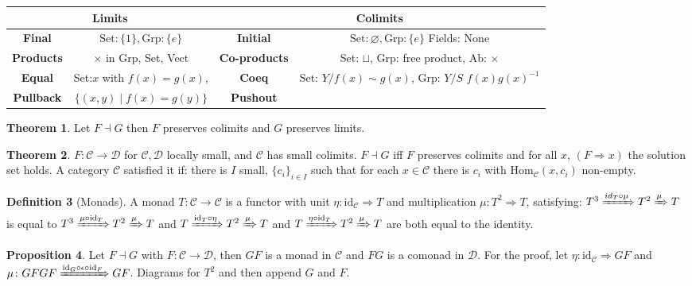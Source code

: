 \documentclass[a4paper,10pt]{article}
\theoremstyle{definition}
\newtheorem{theorem}{Theorem}
\newtheorem{definition}[theorem]{Definition}
\newtheorem{proposition}[theorem]{Proposition}
\newcommand{\Hom}[3][C]{\mathrm{Hom}_\mathcal{#1}(#2, #3)}
\newcommand{\C}{\mathcal{C}}
\newcommand{\D}{\mathcal{D}}
\newcommand{\id}{\mathrm{id}}
\newcommand{\Set}{\mathrm{Set}}
\begin{document}
\begin{center}
\begin{tabular}{ |c|c|c|c|}
    \hline
    
    \multicolumn{2}{|c|}{Limits} & \multicolumn{2}{|c|}{Colimits}\\
    \hline
    \textbf{Final}& $\Set: \{1\}, \mathrm{Grp}: \{e\}$ & \textbf{Initial} & $\Set: \varnothing, \mathrm{Grp}: \{e\}$ Fields: None\\
    \hline
    \textbf{Products} & $\times$ in Grp, Set, Vect & \textbf{Co-products} & Set: $\sqcup$, Grp: free product, Ab: $\times$ \\
    \hline
    \textbf{Equal} &Set:$x$ with $f(x) = g(x)$, & \textbf{Coeq} & $\Set$: $Y / f(x) \sim g(x)$, Grp: $Y/S$ $f(x)g(x)^{-1}$ \\
    \hline
    \textbf{Pullback} &$\{(x, y) \mid f(x) = g(y)\}$ & \textbf{Pushout}& \\
    \hline
\end{tabular}
\end{center}

\begin{theorem}
    Let $F \dashv G$ then $F$ preserves colimits and $G$ preserves limits.
\end{theorem}

\begin{theorem}
    $F \colon \C \rightarrow \D$ for $\C, \D$ locally small, and $\C$ has small colimits.
    $F \dashv G$ iff $F$ preserves colimits and for all $x$, $(F \Rightarrow x)$ the solution set holds. A category $\C$ satisfied it if:
    there is $I$ small, $\{c_i\}_{i \in I}$ such that for each $x \in \C$ there is $c_i$ with $\Hom{x}{c_i}$ non-empty.
\end{theorem}


\begin{definition}[Monads]
    A monad $T \colon \C \rightarrow \C$ is a functor with unit $\eta \colon \id_\C \Rightarrow T$ and multiplication $\mu \colon T^2 \Rightarrow T$, satisfying: $T^3 \xRightarrow{id_T \circ \mu} T^2 \xRightarrow{\mu} T$ is equal to $T^3 \xRightarrow{\mu \circ \id_T} T^2 \xRightarrow{\mu} T$ and $T \xRightarrow{\id_T \circ \eta} T^2 \xRightarrow{\mu} T$ and $T \xRightarrow{\eta \circ \id_T} T^2 \xRightarrow{\mu} T$ are both equal to the identity.
\end{definition}

\begin{proposition}
    Let $F \dashv G$ with $F \colon \C \rightarrow \D$, then $GF$ is a monad in $\C$ and $FG$ is a comonad in $\D$.
    For the proof, let $\eta \colon \id_\C \Rightarrow GF$  and $\mu \colon GFGF \xRightarrow{\id_G \circ \epsilon \circ \id_F} GF$. Diagrams for $T^2$ and then append $G$ and $F$.
\end{proposition}
\end{document}
